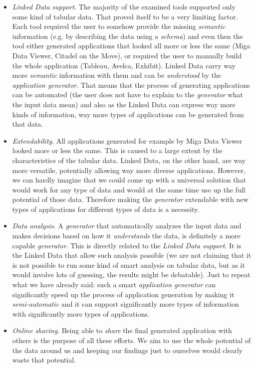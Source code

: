 \begin{itemize}
\item \emph{Linked Data support}. The majority of the examined tools supported only some kind of tabular data. That proved itself to be a very limiting factor. Each tool required the user to somehow provide the missing \emph{semantic} information (e.g. by describing the data using a \emph{schema}) and even then the tool either generated applications that looked all more or less the same (Miga Data Viewer, Citadel on the Move), or required the user to manually build the whole application (Tableau, Avelca, Exhibit). Linked Data carry way more \emph{semantic} information with them and can be \emph{understood} by the \emph{application generator}. That means that the process of generating applications can be automated (the user does not have to explain to the \emph{generator} what the input data mean) and also as the Linked Data can express way more kinds of information, way more types of applications can be generated from that data.
\item \emph{Extendability}. All applications generated for example by Miga Data Viewer looked more or less the same.  This is caused to a large extent by the characteristics of the tabular data. Linked Data, on the other hand, are way more versatile, potentially allowing way more diverse applications. However, we can hardly imagine that we could come up with a universal solution that would work for any type of data and would at the same time use up the full potential of those data. Therefore making the \emph{generator} extendable with new types of applications for different types of data is a necessity.
\item \emph{Data analysis}. A \emph{generator} that automatically analyzes the input data and makes decisions based on how it \emph{understands} the data, is definitely a more capable \emph{generator}. This is directly related to the \emph{Linked Data support}. It is the Linked Data that allow such analysis possible (we are not claiming that it is not possible to run some kind of smart analysis on tabular data, but as it would involve lots of guessing, the results might be debatable). Just to repeat what we have already said: such a smart \emph{application generator} can significantly speed up the process of application generation by making it \emph{semi-automatic} and it can support significantly more types of information with significantly more types of applications.
\item \emph{Online sharing}. Being able to \emph{share} the final generated application with others is the purpose of all these efforts. We aim to use the whole potential of the data around us and keeping our findings just to ourselves would clearly waste that potential.

\end{itemize}
